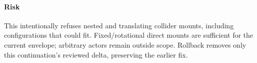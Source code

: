 \documentclass{article}
\begin{document}
\paragraph{Risk} This intentionally refuses nested and translating collider
mounts, including configurations that could fit. Fixed/rotational direct mounts
are sufficient for the current envelope; arbitrary actors remain outside scope.
Rollback removes only this continuation's reviewed delta, preserving the earlier fix.
\end{document}
